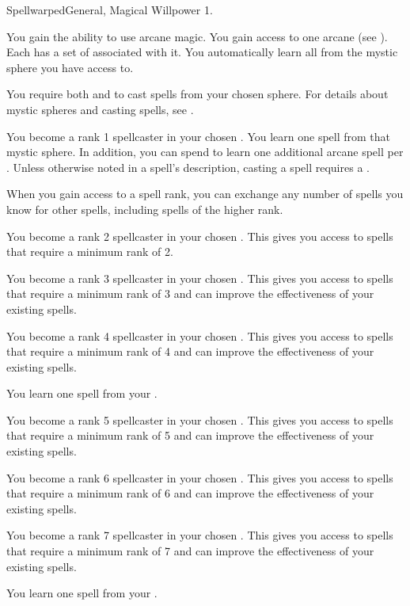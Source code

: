     \begin{feat}{Spellwarped}{General, Magical}
        \featpre Willpower 1.

         You gain the ability to use arcane magic.
        You gain access to one arcane  (see ).
        Each  has a set of  associated with it.
        You automatically learn all  from the mystic sphere you have access to.

        You require both  and  to cast spells from your chosen sphere.
        For details about mystic spheres and casting spells, see .

         You become a rank 1 spellcaster in your chosen .
        You learn one spell from that mystic sphere.
        In addition, you can spend  to learn one additional arcane spell per .
        Unless otherwise noted in a spell's description, casting a spell requires a .

        When you gain access to a spell rank,
            you can exchange any number of spells you know for other spells,
            including spells of the higher rank.

         You become a rank 2 spellcaster in your chosen .
        This gives you access to spells that require a minimum rank of 2.

         You become a rank 3 spellcaster in your chosen .
        This gives you access to spells that require a minimum rank of 3 and can improve the effectiveness of your existing spells.

         You become a rank 4 spellcaster in your chosen .
        This gives you access to spells that require a minimum rank of 4 and can improve the effectiveness of your existing spells.

         You learn one spell from your .

         You become a rank 5 spellcaster in your chosen .
        This gives you access to spells that require a minimum rank of 5 and can improve the effectiveness of your existing spells.

         You become a rank 6 spellcaster in your chosen .
        This gives you access to spells that require a minimum rank of 6 and can improve the effectiveness of your existing spells.

         You become a rank 7 spellcaster in your chosen .
        This gives you access to spells that require a minimum rank of 7 and can improve the effectiveness of your existing spells.

         You learn one spell from your .
    \end{feat}

